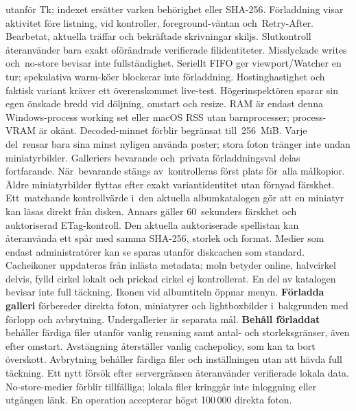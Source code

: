 \documentclass[11pt,a4paper]{article}
\newcommand{\ui}[1]{\textbf{#1}}
\begin{document}
utanför Tk; indexet ersätter varken behörighet eller SHA-256.
Förladdning visar aktivitet före listning, vid kontroller, foreground-väntan
och~Retry-After. Bearbetat, aktuella träffar och bekräftade skrivningar skiljs.
Slutkontroll återanvänder bara exakt oförändrade verifierade filidentiteter.
Misslyckade writes och~no-store bevisar inte fullständighet. Seriellt FIFO
ger viewport/Watcher en tur; spekulativa warm-köer blockerar inte förladdning.
Hostinghastighet och faktisk variant kräver ett överenskommet live-test.
Högerinspektören sparar sin egen önskade bredd vid döljning, omstart och resize.
RAM är endast denna Windows-process working set eller macOS RSS utan barnprocesser;
process-VRAM är okänt. Decoded-minnet förblir begränsat till~256~MiB.
Varje del~rensar bara sina minst nyligen använda poster; stora foton tränger
inte undan miniatyrbilder. Galleriers bevarande och~privata förladdningsval
delas fortfarande. När~bevarande stängs av~kontrolleras först plats för~alla
målkopior. Äldre miniatyrbilder flyttas efter exakt variantidentitet utan
förnyad färskhet. Ett~matchande kontrollvärde i~den
aktuella albumkatalogen gör att en miniatyr kan läsas direkt från disken.
Annars gäller 60~sekunders färskhet och auktoriserad ETag-kontroll. Den
aktuella auktoriserade spellistan kan återanvända ett spår med samma SHA-256,
storlek och format. Medier som endast administratörer kan se sparas
utanför diskcachen som standard.
Cacheikoner uppdateras från inlästa metadata: moln betyder online, halvcirkel
delvis, fylld cirkel lokalt och prickad cirkel ej kontrollerat. En del av
katalogen bevisar inte full täckning. Ikonen vid albumtiteln öppnar menyn.
\ui{Förladda galleri} förbereder direkta foton, miniatyrer och lightboxbilder
i~bakgrunden med förlopp och avbrytning. Undergallerier är separata mål.
\ui{Behåll förladdat} behåller färdiga filer utanför vanlig rensning samt
antal- och storleksgränser, även efter omstart. Avstängning återställer vanlig
cachepolicy, som kan ta bort överskott. Avbrytning behåller färdiga filer och
inställningen utan att hävda full täckning. Ett nytt försök efter servergränsen
återanvänder verifierade lokala data. No-store-medier förblir tillfälliga;
lokala filer kringgår inte inloggning eller utgången länk. En operation
accepterar högst 100\,000 direkta foton.
\end{document}

